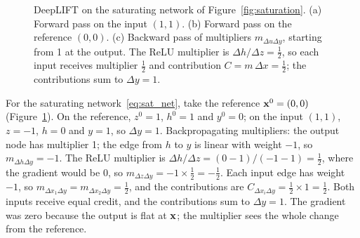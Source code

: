 \begin{figure}[t]
  \centering
  \newcommand{\satnet}[6]{%
    \node[nn] (x1) at (0,0) {$#1$}; \node[nn] (x2) at (1.4,0) {$#2$};
    \node[nn] (z) at (0.7,1.2) {$#3$}; \node[nn] (h) at (0.7,2.1) {$#4$}; \node[nn] (y) at (0.7,3.1) {$#5$};
    \node[nnb, right=1mm of z] {$+1$}; \node[nnb, right=1mm of y] {$+1$};
    \draw (x1) -- node[wlab, left] {$-1$} (z); \draw (x2) -- node[wlab, right] {$-1$} (z);
    \draw (z) -- (h); \draw (h) -- node[wlab, left] {$-1$} (y);
    \node[font=\footnotesize, below] at (x1.south) {$x_1$}; \node[font=\footnotesize, below] at (x2.south) {$x_2$};
    \node[font=\small\bfseries, anchor=west] at (-0.5,3.8) {#6};}
  \caption{DeepLIFT on the saturating network of Figure~\ref{fig:saturation}. (a) Forward pass on the input $(1,1)$. (b) Forward pass on the reference $(0,0)$. (c) Backward pass of multipliers $m_{\Delta u\Delta y}$, starting from 1 at the output. The ReLU multiplier is $\Delta h/\Delta z=\frac12$, so each input receives multiplier $\frac12$ and contribution $C=m\,\Delta x=\frac12$; the contributions sum to $\Delta y=1$.}
  \label{fig:deeplift_sat}
\end{figure}

For the saturating network~\eqref{eq:sat_net}, take the reference $\mathbf{x}^0=(0,0)$ (Figure~\ref{fig:deeplift_sat}). On the reference, $z^0=1$, $h^0=1$ and $y^0=0$; on the input $(1,1)$, $z=-1$, $h=0$ and $y=1$, so $\Delta y=1$. Backpropagating multipliers: the output node has multiplier 1; the edge from $h$ to $y$ is linear with weight $-1$, so $m_{\Delta h\Delta y}=-1$. The ReLU multiplier is $\Delta h/\Delta z=(0-1)/(-1-1)=\frac12$, where the gradient would be 0, so $m_{\Delta z\Delta y}=-1\times\frac12=-\frac12$. Each input edge has weight $-1$, so $m_{\Delta x_1\Delta y}=m_{\Delta x_2\Delta y}=\frac12$, and the contributions are $C_{\Delta x_i\Delta y}=\frac12\times 1=\frac12$. Both inputs receive equal credit, and the contributions sum to $\Delta y=1$. The gradient was zero because the output is flat at $\mathbf{x}$; the multiplier sees the whole change from the reference.

